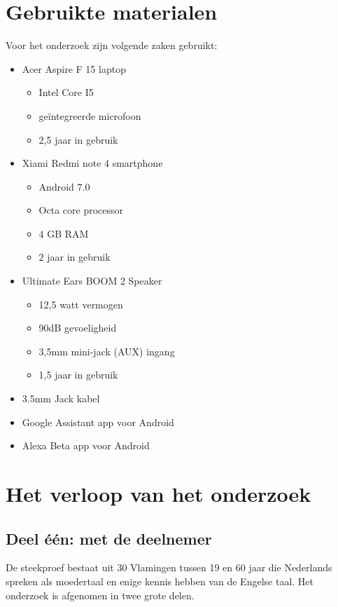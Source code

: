\section{Gebruikte materialen}
Voor het onderzoek zijn volgende zaken gebruikt:
\begin{itemize}
    \item Acer Aspire F 15 laptop
    \begin{itemize}
        \item Intel Core I5
        \item geïntegreerde microfoon
        \item 2,5 jaar in gebruik
    \end{itemize}
    \item Xiami Redmi note 4 smartphone
    \begin{itemize}
        \item Android 7.0
        \item Octa core processor
        \item 4 GB RAM
        \item 2 jaar in gebruik
    \end{itemize}
    \item Ultimate Ears BOOM 2 Speaker
    \begin{itemize}
        \item 12,5 watt vermogen
        \item 90dB gevoeligheid
        \item 3,5mm mini-jack (AUX) ingang
        \item 1,5 jaar in gebruik
    \end{itemize}
    \item 3.5mm Jack kabel
    \item Google Assistant app voor Android
    \item Alexa Beta app voor Android
\end{itemize}

\section{Het verloop van het onderzoek}
\subsection{Deel één: met de deelnemer}
\label{ss:deel één: met de deelnemer}
De steekproef bestaat uit 30 Vlamingen tussen 19 en 60 jaar die Nederlands spreken als moedertaal en enige kennis hebben van de Engelse taal. Het onderzoek is afgenomen in twee grote delen.

